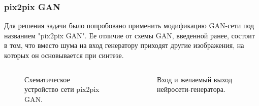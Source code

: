 \documentclass[9pt]{beamer}
\begin{document}
\begin{frame}\frametitle{pix2pix GAN}
	Для решения задачи было попробовано применить модификацию GAN-сети под названием "pix2pix GAN". Ее отличие от схемы GAN, введенной ранее, состоит в том, что вместо шума на вход генератору приходят другие изображения, на которых он основывается при синтезе.
	\begin{columns}
			\begin{figure}
				\caption{Схематическое устройство сети pix2pix GAN.}
				\label{p2p}
			\end{figure}
			\begin{figure}
				\caption{Вход и желаемый выход нейросети-генератора.}
				\label{p2p-gen}
			\end{figure}
	\end{columns}
\end{frame}
\end{document}
